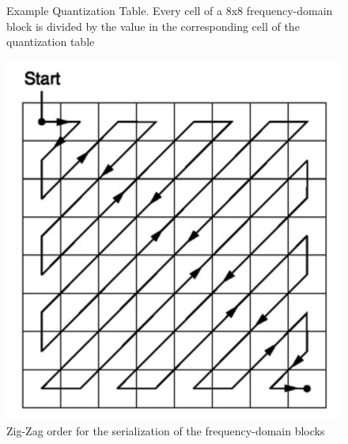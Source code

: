 \begin{figure}[ht]
\begin{minipage}[b]{0.25\linewidth}
    \caption{Example Quantization Table. Every cell of a 8x8 frequency-domain block is divided by the value in the corresponding cell of the quantization table}
    \label{fig:quantizationTable}
    \end{minipage}
\hspace{0.05\linewidth}
    \begin{minipage}[b]{0.24\linewidth}
    \centering
    \includegraphics[width=\textwidth]{Pictures/ZigZag.png}
    \caption{Zig-Zag order for the serialization of the frequency-domain blocks}
    \label{fig:ZigZag}
    \end{minipage}
\end{figure}
